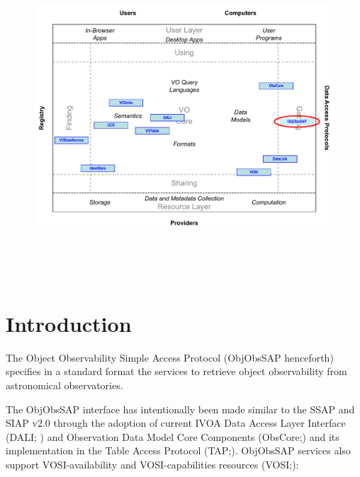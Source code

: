 \documentclass[11pt,a4paper]{ivoatex/ivoa}
\begin{document}

\begin{figure}[H]
\advance\leftskip 0.0in
\includegraphics[width=6.0in,height=4.73in]{./role_diagram.pdf}
\end{figure}


\pagebreak



\section{Introduction}\label{section:_Toc415497365}


The Object Observability Simple Access Protocol (ObjObsSAP henceforth)
specifies in a standard format the services to retrieve object
observability from astronomical observatories.



The ObjObsSAP interface has intentionally been made similar to the SSAP
\citep{2012ivoa.spec.0210T} and SIAP v2.0 \citep{2015ivoa.spec.0617D} through the adoption
of current IVOA Data Access Layer Interface (DALI; \citealt{2017ivoa.spec.0517D}) and Observation Data
Model Core Components (ObsCore;\citealt{2017ivoa.spec.0509L}) and its implementation in
the Table Access Protocol (TAP;\citealt{2019ivoa.spec.0927D}). ObjObsSAP services also support
VOSI-availability and VOSI-capabilities resources (VOSI;\citealt{2017ivoa.spec.0524G}):
\end{document}
